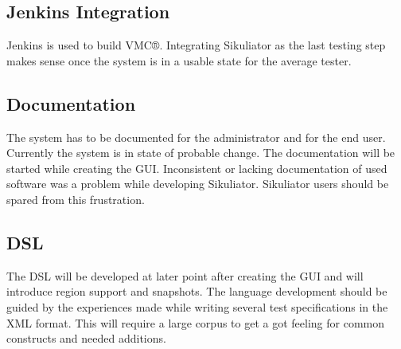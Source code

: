\documentclass[a4paper,twocolumn,twoside]{article}
\newcommand{\VMC}[0]{VMC®}
\newcommand{\Sik}[0]{Sikuliator}
\begin{document}
\subsection{Jenkins Integration}
Jenkins is used to build \VMC{}.
Integrating \Sik{} as the last testing step makes sense once the system is in a usable state for the average tester.

\subsection{Documentation}
The system has to be documented for the administrator and for the end user.
Currently the system is in state of probable change.
The documentation will be started while creating the GUI. 
Inconsistent or lacking documentation of used software was a problem while developing \Sik{}.
\Sik{} users should be spared from this frustration.

\subsection{DSL}
The DSL will be developed at later point after creating the GUI and will introduce region support and snapshots.
The language development should be guided by the experiences made while writing several test specifications in the XML format.
This will require a large corpus to get a got feeling for common constructs and needed additions.





\printbibliography[notkeyword=software,resetnumbers=true,prefixnumbers=R]
\printbibliography[keyword=used,title={Used software},resetnumbers=true,prefixnumbers=US]
\printbibliography[notkeyword=used,keyword=software,title={Other software},resetnumbers=true,prefixnumbers=OS]
\end{document}
